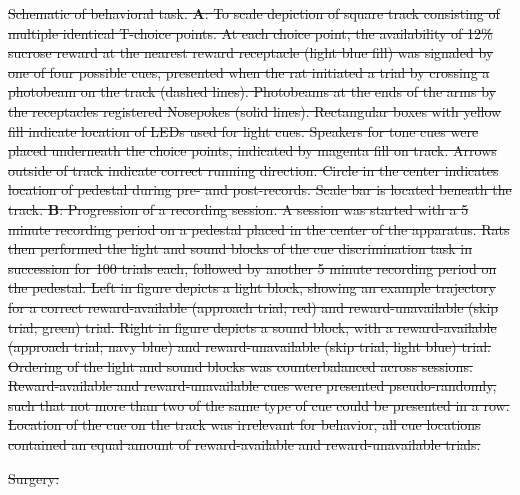 \documentclass[11pt]{article}
\newcommand{\bsf}[1]{\textbf{#1}}
\providecommand{\DIFdel}[1]{{\protect\color{red}\sout{#1}}}                      %
\providecommand{\DIFdelFL}[1]{\DIFdel{#1}} %
\begin{document}
{%
\DIFdelFL{Schematic of behavioral task. \bsf{A}: To scale depiction of square
track consisting of multiple identical T-choice points. At each choice point,
the availability of 12\% sucrose reward at the nearest reward receptacle (light
blue fill) was signaled by one of four possible cues, presented when the rat
initiated a trial by crossing a photobeam on the track (dashed
lines). Photobeams at the ends of the arms by the receptacles registered
Nosepokes (solid lines). Rectangular boxes with yellow fill indicate location of LEDs used
for light cues. Speakers for tone cues were placed underneath the choice
points, indicated by magenta fill on track. Arrows outside of track indicate correct running direction. Circle in the center indicates location of pedestal during pre- and post-records. Scale bar is located beneath the track. \bsf{B}: Progression of
a recording session. A session was started with a 5 minute recording period on
a pedestal placed in the center of the apparatus. Rats then performed the light and sound blocks of the cue discrimination task in succession for 100 trials each, followed by another 5 minute recording period on the pedestal. Left in figure depicts a light block, showing an
example trajectory for a correct reward-available (approach trial; red) and reward-unavailable
(skip trial; green) trial. Right in figure depicts a sound block, with a reward-available
(approach trial; navy blue) and reward-unavailable (skip trial; light blue) trial. Ordering of the light and sound blocks was counterbalanced across sessions. Reward-available and reward-unavailable cues were presented pseudo-randomly, such that not more than two of the same type of cue could be presented in a row. Location of the cue on the track was irrelevant for
behavior, all cue locations contained an equal amount of reward-available and
reward-unavailable trials.
}}

\DIFdel{Surgery:}%
\end{document}
